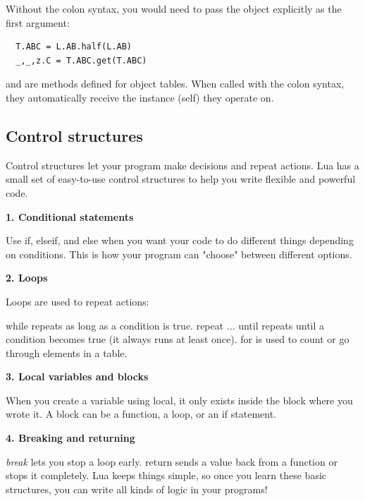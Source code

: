 \begin{enumerate}[label=(\alph*)]
\begin{tkzexample}[latex = .2\textwidth]
\end{tkzexample}

Without the colon syntax, you would need to pass the object explicitly as the first argument:

\begin{verbatim}
  T.ABC = L.AB.half(L.AB)
  _,_,z.C = T.ABC.get(T.ABC)
\end{verbatim}

 and  are methods defined for object tables. When called with the colon syntax, they automatically receive the instance (self) they operate on.
\end{enumerate}

\subsection{Control structures}


Control structures let your program make decisions and repeat actions. Lua has a small set of easy-to-use control structures to help you write flexible and powerful code.

\textbf{1. Conditional statements}

Use if, elseif, and else when you want your code to do different things depending on conditions. This is how your program can "choose" between different options.

\textbf{2. Loops}

Loops are used to repeat actions:

while repeats as long as a condition is true.
repeat ... until repeats until a condition becomes true (it always runs at least once).
for is used to count or go through elements in a table.

\textbf{3. Local variables and blocks}

When you create a variable using local, it only exists inside the block where you wrote it. A block can be a function, a loop, or an if statement.

\textbf{4. Breaking and returning}

\emph{break} lets you stop a loop early.
return sends a value back from a function or stops it completely.
Lua keeps things simple, so once you learn these basic structures, you can write all kinds of logic in your programs!

